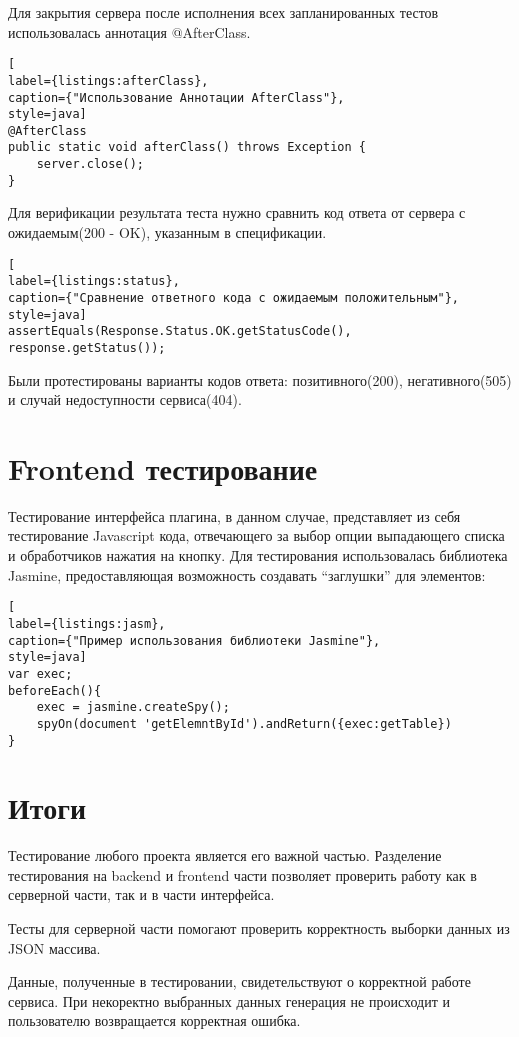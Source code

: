 Для закрытия сервера после исполнения всех запланированных тестов использовалась аннотация @AfterClass.

\begin{lstlisting}[
label={listings:afterClass},
caption={"Использование Аннотации AfterClass"},
style=java]
@AfterClass
public static void afterClass() throws Exception {
	server.close();
}
\end{lstlisting}

Для верификации результата теста нужно сравнить код ответа от сервера с ожидаемым(200 - OK), указанным в спецификации.

\begin{lstlisting}[
label={listings:status},
caption={"Сравнение ответного кода с ожидаемым положительным"},
style=java]
assertEquals(Response.Status.OK.getStatusCode(), response.getStatus());
\end{lstlisting}

Были протестированы варианты кодов ответа: позитивного(200), негативного(505) и случай недоступности сервиса(404).

\section{Frontend тестирование}

Тестирование интерфейса плагина, в данном случае, представляет из себя тестирование Javascript кода, отвечающего за выбор опции выпадающего списка и обработчиков нажатия на кнопку. Для тестирования использовалась библиотека Jasmine, предоставляющая возможность создавать “заглушки” для элементов:

\begin{lstlisting}[
label={listings:jasm},
caption={"Пример использования библиотеки Jasmine"},
style=java]
var exec;
beforeEach(){
	exec = jasmine.createSpy();
	spyOn(document 'getElemntById').andReturn({exec:getTable})
}
\end{lstlisting}

\section{Итоги}

Тестирование любого проекта является его важной частью. Разделение тестирования на backend и frontend части позволяет проверить работу как в серверной части, так и в части интерфейса. 

Тесты для серверной части помогают проверить корректность выборки данных из JSON массива.

Данные, полученные в тестировании, свидетельствуют о корректной работе сервиса. При некоректно выбранных данных генерация не происходит и пользователю возвращается корректная ошибка.
